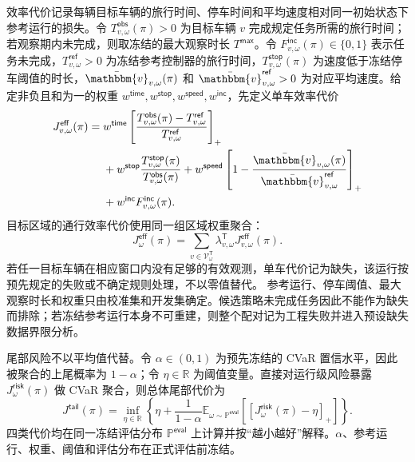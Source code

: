 \documentclass[10pt,a4paper,twocolumn]{article}
\begin{document}
效率代价记录每辆目标车辆的旅行时间、停车时间和平均速度相对同一初始状态下参考运行的损失。令 $T_{v,\omega}^{\mathsf{obs}}(\pi)>0$ 为目标车辆 $v$ 完成规定任务所需的旅行时间；若观察期内未完成，则取冻结的最大观察时长 $T^{\mathsf{max}}$。令 $F_{v,\omega}^{\mathsf{inc}}(\pi)\in\{0,1\}$ 表示任务未完成，$T_{v,\omega}^{\mathsf{ref}}>0$ 为冻结参考控制器的旅行时间，$T_{v,\omega}^{\mathsf{stop}}(\pi)$ 为速度低于冻结停车阈值的时长，$\bar{\mathbbm{v}}_{v,\omega}(\pi)$ 和 $\bar{\mathbbm{v}}_{v,\omega}^{\mathsf{ref}}>0$ 为对应平均速度。给定非负且和为一的权重 $w^{\mathsf{time}},w^{\mathsf{stop}},w^{\mathsf{speed}},w^{\mathsf{inc}}$，先定义单车效率代价
\begin{equation*}
\begin{aligned}
J_{v,\omega}^{\mathsf{eff}}(\pi)
={}&w^{\mathsf{time}}\left[
 \frac{T_{v,\omega}^{\mathsf{obs}}(\pi)-T_{v,\omega}^{\mathsf{ref}}}
 {T_{v,\omega}^{\mathsf{ref}}}\right]_+\\
&+w^{\mathsf{stop}}\frac{T_{v,\omega}^{\mathsf{stop}}(\pi)}
 {T_{v,\omega}^{\mathsf{obs}}(\pi)}
+w^{\mathsf{speed}}\left[
 1-\frac{\bar{\mathbbm{v}}_{v,\omega}(\pi)}{\bar{\mathbbm{v}}_{v,\omega}^{\mathsf{ref}}}\right]_+\\
&+w^{\mathsf{inc}}F_{v,\omega}^{\mathsf{inc}}(\pi).
\end{aligned}
\end{equation*}
目标区域的通行效率代价使用同一组区域权重聚合：
\begin{equation*}
J_{\omega}^{\mathsf{eff}}(\pi)
=\sum_{v\in\mathcal V^{\mathsf T}_{\omega}}
\lambda_{v,\omega}^{\mathsf T}J_{v,\omega}^{\mathsf{eff}}(\pi).
\end{equation*}
若任一目标车辆在相应窗口内没有足够的有效观测，单车代价记为缺失，该运行按预先规定的失败或不确定规则处理，不以零值替代。
参考运行、停车阈值、最大观察时长和权重只由校准集和开发集确定。候选策略未完成任务因此不能作为缺失而排除；若冻结参考运行本身不可重建，则整个配对记为工程失败并进入预设缺失数据界限分析。

尾部风险不以平均值代替。令 $\alpha\in(0,1)$ 为预先冻结的 CVaR 置信水平，因此被聚合的上尾概率为 $1-\alpha$；令 $\eta\in\mathbb R$ 为阈值变量。直接对运行级风险暴露 $J_{\omega}^{\mathsf{risk}}(\pi)$ 做 CVaR 聚合，则总体尾部代价为
\begin{equation*}
J^{\mathsf{tail}}(\pi)=
\inf_{\eta\in\mathbb R}
\left\{\eta+\frac{1}{1-\alpha}
\mathbb E_{\omega\sim\mathbb P^{\mathsf{eval}}}\!\left[\left[J_{\omega}^{\mathsf{risk}}(\pi)-\eta\right]_+\right]\right\}.
\end{equation*}
四类代价均在同一冻结评估分布 $\mathbb P^{\mathsf{eval}}$ 上计算并按“越小越好”解释。$\alpha$、参考运行、权重、阈值和评估分布在正式评估前冻结。
\end{document}
